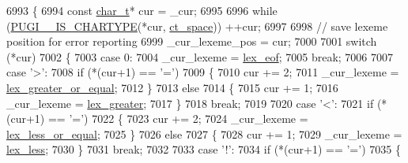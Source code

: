 \begin{DoxyCode}
6993         \{
6994             \textcolor{keyword}{const} \hyperlink{namespacepugi_aef5a7a62cba0507542220ea15afe39df}{char\_t}* cur = \_cur;
6995 
6996             \textcolor{keywordflow}{while} (\hyperlink{pugixml_8cpp_a2adf5ae9b7505408a18e9f3bb1b3d332}{PUGI\_\_IS\_CHARTYPE}(*cur, \hyperlink{pugixml_8cpp_ae83a55e5947d28c62625b690b1484108ac957a1774b6a4430e583bcb881909372}{ct\_space})) ++cur;
6997 
6998             \textcolor{comment}{// save lexeme position for error reporting}
6999             \_cur\_lexeme\_pos = cur;
7000 
7001             \textcolor{keywordflow}{switch} (*cur)
7002             \{
7003             \textcolor{keywordflow}{case} 0:
7004                 \_cur\_lexeme = \hyperlink{pugixml_8cpp_a1fdd6d0a63acbba1491ab331ddce4ac9aade5d69e447274d8785ebc7d438be522}{lex\_eof};
7005                 \textcolor{keywordflow}{break};
7006             
7007             \textcolor{keywordflow}{case} \textcolor{charliteral}{'>'}:
7008                 \textcolor{keywordflow}{if} (*(cur+1) == \textcolor{charliteral}{'='})
7009                 \{
7010                     cur += 2;
7011                     \_cur\_lexeme = \hyperlink{pugixml_8cpp_a1fdd6d0a63acbba1491ab331ddce4ac9a6308ad256806534e1cd586574718a562}{lex\_greater\_or\_equal};
7012                 \}
7013                 \textcolor{keywordflow}{else}
7014                 \{
7015                     cur += 1;
7016                     \_cur\_lexeme = \hyperlink{pugixml_8cpp_a1fdd6d0a63acbba1491ab331ddce4ac9abef050e09f087253f62bd3b4b6b435af}{lex\_greater};
7017                 \}
7018                 \textcolor{keywordflow}{break};
7019 
7020             \textcolor{keywordflow}{case} \textcolor{charliteral}{'<'}:
7021                 \textcolor{keywordflow}{if} (*(cur+1) == \textcolor{charliteral}{'='})
7022                 \{
7023                     cur += 2;
7024                     \_cur\_lexeme = \hyperlink{pugixml_8cpp_a1fdd6d0a63acbba1491ab331ddce4ac9acd542cd6bfd08efcfa647426a7d577b8}{lex\_less\_or\_equal};
7025                 \}
7026                 \textcolor{keywordflow}{else}
7027                 \{
7028                     cur += 1;
7029                     \_cur\_lexeme = \hyperlink{pugixml_8cpp_a1fdd6d0a63acbba1491ab331ddce4ac9a51a5852f31a8c2bd889f340ac3ab9fe4}{lex\_less};
7030                 \}
7031                 \textcolor{keywordflow}{break};
7032 
7033             \textcolor{keywordflow}{case} \textcolor{charliteral}{'!'}:
7034                 \textcolor{keywordflow}{if} (*(cur+1) == \textcolor{charliteral}{'='})
7035                 \{

\end{DoxyCode}
